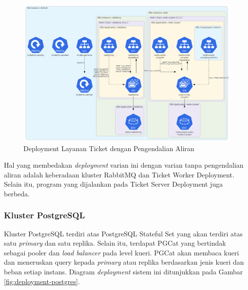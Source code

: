 \begin{figure}[htbp]
    \centering
    \includegraphics[width=1\textwidth]{resources/chapter-4/ticket-fc.png}
    \caption{Deployment Layanan Ticket dengan Pengendalian Aliran}
    \label{fig:deployment-ticket-fc}
\end{figure}

Hal yang membedakan \textit{deployment} varian ini dengan varian tanpa pengendalian aliran adalah keberadaan kluster RabbitMQ dan Ticket Worker Deployment. Selain itu, program yang dijalankan pada Ticket Server Deployment juga berbeda.

\pagebreak

\subsubsection{Kluster PostgreSQL}

Kluster PostgreSQL terdiri atas PostgreSQL Stateful Set yang akan terdiri atas satu \textit{primary} dan satu replika. Selain itu, terdapat PGCat yang bertindak sebagai pooler dan \textit{load balancer} pada level kueri. PGCat akan membaca kueri dan meneruskan query kepada \textit{primary} atau replika berdasarkan jenis kueri dan beban setiap instans. Diagram \textit{deployment} sistem ini ditunjukkan pada Gambar \ref{fig:deployment-postgres}.

